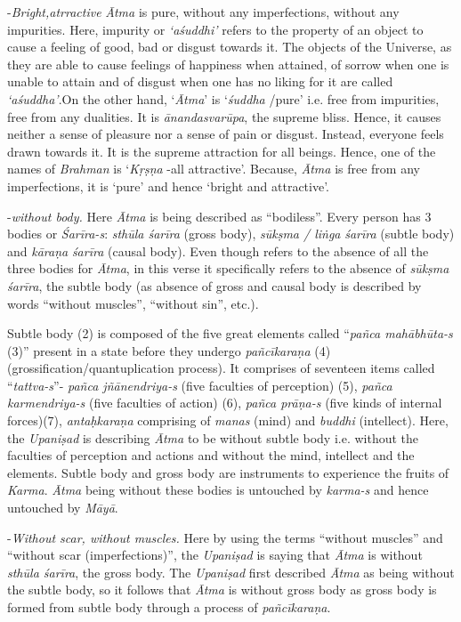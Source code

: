 -\emph{Bright,atrractive} \emph{Ātma} is pure, without any imperfections, without any impurities. Here, impurity or \emph{`aśuddhi'} refers to the property of an object to cause a feeling of good, bad or disgust towards it. The objects of the Universe, as they are able to cause feelings of happiness when attained, of sorrow when one is unable to attain and of disgust when one has no liking for it are called \emph{`aśuddha'}.On the other hand, `\emph{Ātma}' is `\emph{śuddha} /pure' i.e. free from impurities, free from any dualities. It is \emph{ānandasvarūpa}, the supreme bliss. Hence, it causes neither a sense of pleasure nor a sense of pain or disgust. Instead, everyone feels drawn towards it. It is the supreme attraction for all beings. Hence, one of the names of \emph{Brahman} is `\emph{Kṛṣṇa} -all attractive'. Because, \emph{Ātma} is free from any imperfections, it is `pure' and hence `bright and attractive'.

-\emph{without body.} Here \emph{Ātma} is being described as ``bodiless''. Every person has 3 bodies or \emph{Śarīra-s}: \emph{sthūla śarīra} (gross body), \emph{sūkṣma / liṅga} \emph{śarīra} (subtle body) and \emph{kāraṇa} \emph{śarīra} (causal body). Even though  refers to the absence of all the three bodies for \emph{Ātma}, in this verse it specifically refers to the absence of \emph{sūkṣma śarīra}, the subtle body (as absence of gross and causal body is described by words ``without muscles'', ``without sin'', etc.).

Subtle body (2) is composed of the five great elements called ``\emph{pañca mahābhūta-s} (3)'' present in a state before they undergo \emph{pañcīkaraṇa} (4) (grossification/quantuplication process). It comprises of seventeen items called ``\emph{tattva-s}''- \emph{pañca jñānendriya-s} (five faculties of perception) (5), \emph{pañca karmendriya-s} (five faculties of action) (6), \emph{pañca prāṇa-s} (five kinds of internal forces)(7), \emph{antaḥkaraṇa} comprising of \emph{manas} (mind) and \emph{buddhi} (intellect). Here, the \emph{Upaniṣad} is describing \emph{Ātma} to be without subtle body i.e. without the faculties of perception and actions and without the mind, intellect and the elements. Subtle body and gross body are instruments to experience the fruits of \emph{Karma}. \emph{Ātma} being without these bodies is untouched by \emph{karma-s} and hence untouched by \emph{Māyā}.

-\emph{Without scar, without muscles.} Here by using the terms ``without muscles'' and ``without scar (imperfections)'', the \emph{Upaniṣad} is saying that \emph{Ātma} is without \emph{sthūla śarīra}, the gross body. The \emph{Upaniṣad} first described \emph{Ātma} as being without the subtle body, so it follows that \emph{Ātma} is without gross body as gross body is formed from subtle body through a process of \emph{pañcīkaraṇa}.

